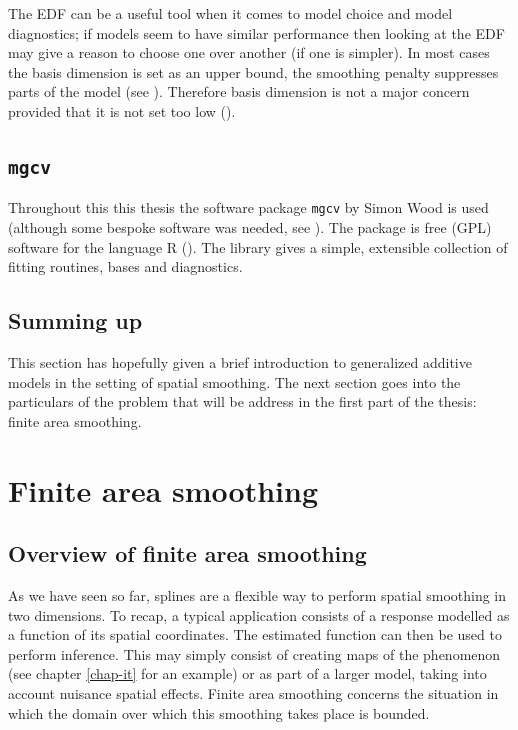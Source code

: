 The EDF can be a useful tool when it comes to model choice and model diagnostics; if models seem to have similar performance then looking at the EDF may give a reason to choose one over another (if one is simpler). In most cases the basis dimension is set as an upper bound, the smoothing penalty suppresses parts of the model (see ). Therefore basis dimension is not a major concern provided that it is not set too low (\cite[p. 161]{simonbook}). 

\subsection{\texttt{mgcv}}
\label{intro-mgcv}

Throughout this this thesis the software package \texttt{mgcv} by Simon Wood is used (although some bespoke software was needed, see ). The package is free (GPL) software for the language \textsf{R} (\cite{Rsoftware}). The library gives a simple, extensible collection of fitting routines, bases and diagnostics.


\subsection{Summing up}

This section has hopefully given a brief introduction to generalized additive models in the setting of spatial smoothing. The next section goes into the particulars of the problem that will be address in the first part of the thesis: finite area smoothing.


\section{Finite area smoothing}
\label{intro-FAS}

\subsection{Overview of finite area smoothing}

As we have seen so far, splines are a flexible way to perform spatial smoothing in two dimensions. To recap, a typical application consists of a response modelled as a function of its spatial coordinates. The estimated function can then be used to perform inference. This may simply consist of creating maps of the phenomenon (see chapter \ref{chap-it} for an example) or as part of a larger model, taking into account nuisance spatial effects. Finite area smoothing concerns the situation in which the domain over which this smoothing takes place is bounded.

